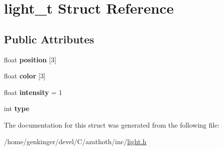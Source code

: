 \hypertarget{structlight__t}{}\section{light\+\_\+t Struct Reference}
\label{structlight__t}
\subsection*{Public Attributes}
\begin{DoxyCompactItemize}
\item 
\mbox{\label{structlight__t_aea47d09293248f2466e094bfd329b2c0}} 
float {\bfseries position} \mbox{[}3\mbox{]}
\item 
\mbox{\label{structlight__t_abb8441f18d641e583444c5ce777add2b}} 
float {\bfseries color} \mbox{[}3\mbox{]}
\item 
\mbox{\label{structlight__t_aadaf5789247f5779cedf8581a003965c}} 
float {\bfseries intensity} = 1
\item 
\mbox{\label{structlight__t_a5578c8da392b9bf6cd2d44df99f86bb1}} 
int {\bfseries type}
\end{DoxyCompactItemize}


The documentation for this struct was generated from the following file\+:\begin{DoxyCompactItemize}
\item 
/home/genkinger/devel/\+C/azathoth/inc/\mbox{\hyperlink{light_8h}{light.\+h}}\end{DoxyCompactItemize}
